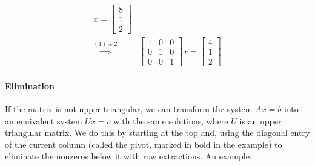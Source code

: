 \begin{align*}
    x
    =
    \begin{bmatrix} 8 \\ 1 \\ 2 \end{bmatrix}
    \\
    \stackrel{(1)\div2}{\implies}
    &\begin{bmatrix} 1 & 0 & 0 \\ 0 & 1 & 0 \\ 0 & 0 & 1 \end{bmatrix}
    x
    =
    \begin{bmatrix} 4 \\ 1 \\ 2 \end{bmatrix}
\end{align*}

\paragraph{Elimination} If the matrix is not upper triangular, we can
transform the system $Ax=b$ into an equivalent system $Ux=c$ with
the same solutions, where $U$ is an upper triangular matrix.
We do this by starting at the top and, using the diagonal entry
of the current column (called the pivot, marked in bold in the
example) to eliminate the nonzeros below it with row extractions.
An example:

\vspace{-\baselineskip}

